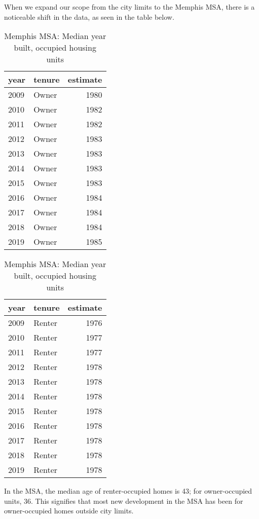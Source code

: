 \documentclass[
]{book}
\begin{document}
When we expand our scope from the city limits to the Memphis MSA, there is a noticeable shift in the data, as seen in the table below.

\begin{table}
\caption{\label{tab:unnamed-chunk-6}Memphis MSA: Median year built, occupied housing units}

\centering
\begin{tabular}[t]{l|l|r}
\hline
year & tenure & estimate\\
\hline
2009 & Owner & 1980\\
\hline
2010 & Owner & 1982\\
\hline
2011 & Owner & 1982\\
\hline
2012 & Owner & 1983\\
\hline
2013 & Owner & 1983\\
\hline
2014 & Owner & 1983\\
\hline
2015 & Owner & 1983\\
\hline
2016 & Owner & 1984\\
\hline
2017 & Owner & 1984\\
\hline
2018 & Owner & 1984\\
\hline
2019 & Owner & 1985\\
\hline
\end{tabular}
\centering
\begin{tabular}[t]{l|l|r}
\hline
year & tenure & estimate\\
\hline
2009 & Renter & 1976\\
\hline
2010 & Renter & 1977\\
\hline
2011 & Renter & 1977\\
\hline
2012 & Renter & 1978\\
\hline
2013 & Renter & 1978\\
\hline
2014 & Renter & 1978\\
\hline
2015 & Renter & 1978\\
\hline
2016 & Renter & 1978\\
\hline
2017 & Renter & 1978\\
\hline
2018 & Renter & 1978\\
\hline
2019 & Renter & 1978\\
\hline
\end{tabular}
\end{table}

In the MSA, the median age of renter-occupied homes is 43; for owner-occupied units, 36. This signifies that most new development in the MSA has been for owner-occupied homes outside city limits.
\end{document}
